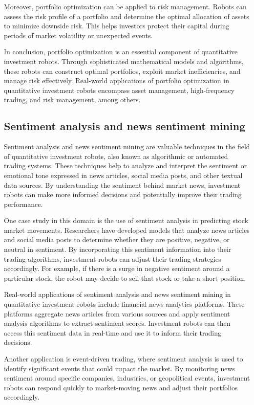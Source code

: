 \documentclass[UTF8]{ctexart}
\begin{document}
Moreover, portfolio optimization can be applied to risk management. Robots can assess the risk profile of a portfolio and determine the optimal allocation of assets to minimize downside risk. This helps investors protect their capital during periods of market volatility or unexpected events.

In conclusion, portfolio optimization is an essential component of quantitative investment robots. Through sophisticated mathematical models and algorithms, these robots can construct optimal portfolios, exploit market inefficiencies, and manage risk effectively. Real-world applications of portfolio optimization in quantitative investment robots encompass asset management, high-frequency trading, and risk management, among others.

\subsection{Sentiment analysis and news sentiment mining}
Sentiment analysis and news sentiment mining are valuable techniques in the field of quantitative investment robots, also known as algorithmic or automated trading systems. These techniques help to analyze and interpret the sentiment or emotional tone expressed in news articles, social media posts, and other textual data sources. By understanding the sentiment behind market news, investment robots can make more informed decisions and potentially improve their trading performance.

One case study in this domain is the use of sentiment analysis in predicting stock market movements. Researchers have developed models that analyze news articles and social media posts to determine whether they are positive, negative, or neutral in sentiment. By incorporating this sentiment information into their trading algorithms, investment robots can adjust their trading strategies accordingly. For example, if there is a surge in negative sentiment around a particular stock, the robot may decide to sell that stock or take a short position.

Real-world applications of sentiment analysis and news sentiment mining in quantitative investment robots include financial news analytics platforms. These platforms aggregate news articles from various sources and apply sentiment analysis algorithms to extract sentiment scores. Investment robots can then access this sentiment data in real-time and use it to inform their trading decisions.

Another application is event-driven trading, where sentiment analysis is used to identify significant events that could impact the market. By monitoring news sentiment around specific companies, industries, or geopolitical events, investment robots can respond quickly to market-moving news and adjust their portfolios accordingly.
\end{document}
